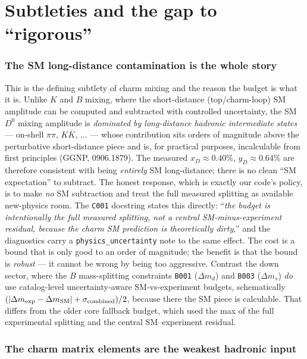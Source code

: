 \documentclass[11pt]{article}
\newcommand{\code}[1]{\texttt{#1}}
\newcommand{\Dz}{D^0}
\newcommand{\xD}{x_D}
\newcommand{\yD}{y_D}
\theoremstyle{definition}
\begin{document}
\part{Subtleties and the gap to ``rigorous''}
\label{part:subtle}

\section{The SM long-distance contamination is the whole story}
\label{sec:longdistance}

This is the defining subtlety of charm mixing and the reason the budget is what
it is. Unlike $K$ and $B$ mixing, where the short-distance (top/charm-loop) SM
amplitude can be computed and subtracted with controlled uncertainty, the SM
$\Dz$ mixing amplitude is \emph{dominated by long-distance hadronic
intermediate states} --- on-shell $\pi\pi$, $K\bar K$, $\dots$ --- whose
contribution sits orders of magnitude above the perturbative short-distance
piece and is, for practical purposes, incalculable from first principles
(GGNP, 0906.1879). The measured $\xD\approx0.40\%$, $\yD\approx0.64\%$ are
therefore consistent with being \emph{entirely} SM long-distance; there is no clean ``SM expectation''
to subtract. The honest response, which is exactly our code's policy, is to make
\emph{no} SM subtraction and treat the full measured splitting as available
new-physics room. The \code{C001} docstring states this directly: ``\emph{the
budget is intentionally the full measured splitting, not a central
SM-minus-experiment residual, because the charm SM prediction is theoretically
dirty},'' and the diagnostics carry a \code{physics\_uncertainty} note to the
same effect. The cost is a bound that is only good to an order of magnitude; the
benefit is that the bound is \emph{robust} --- it cannot be wrong by being too
aggressive. Contrast the down sector, where the $B$ mass-splitting constraints
\code{B001} ($\Delta m_d$) and \code{B003} ($\Delta m_s$) \emph{do} use
catalog-level uncertainty-aware SM-vs-experiment budgets, schematically
$(|\Delta m_{\rm exp}-\Delta m_{\rm SM}|+\sigma_{\rm combined})/2$, because
there the SM piece is calculable. That differs from the older core fallback
budget, which used the max of the full experimental splitting and the central
SM--experiment residual.

\section{The charm matrix elements are the weakest hadronic input}
\label{sec:subtle_me}
\end{document}
